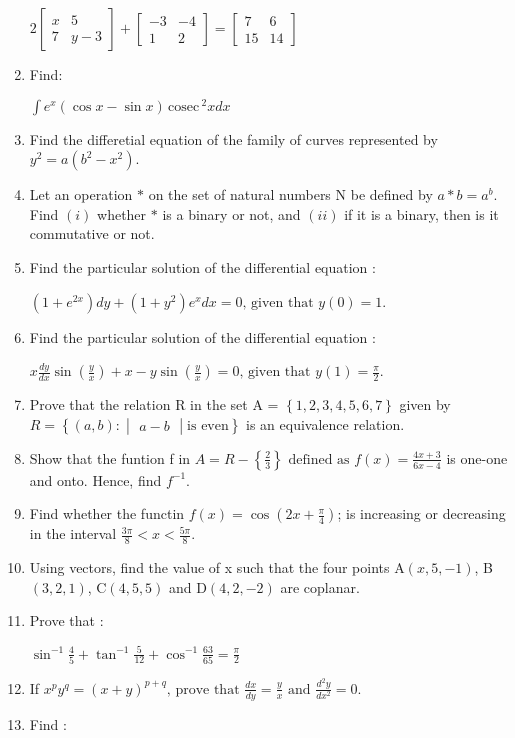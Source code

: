 \documentclass[12pt,-letter paper]{article}
\providecommand{\brak}[1]{\ensuremath{\left (#1\right)}}
\providecommand{\cbrak}[1]{\ensuremath{\left\{#1\right\}}}
\theoremstyle{remark}
\newcommand{\cosec}{\,\text{cosec}\,}
\newcommand{\mydet}[1]{\ensuremath{\begin{vmatrix}#1\end{vmatrix}}}
\begin{document}
\begin{enumerate}
	$2\begin{bmatrix}
		x & 5\\
		7 & y - 3
	\end{bmatrix}
		+ \begin{bmatrix}
		-3 & -4\\
		1 & 2
	\end{bmatrix}
	= \begin{bmatrix}
		7 & 6\\
		15 & 14
	\end{bmatrix}$
\item  Find:


	$\int e^x\brak{\cos x - \sin x}\cosec^2 x dx$
\item Find the differetial equation of the family of curves represented by $y^2 = a\brak{b^2 - x^2}$.
\item  Let an operation $\ast$ on the set of natural numbers N be defined by $a \ast b = a^b$. Find \brak{i} whether $\ast$ is a binary or not, and \brak{ii} if it is a binary, then is it commutative or not. 
\item  Find the particular solution of the differential equation :


	$\brak{1 + e^{2x}}dy + \brak{1 + y^{2}}e^xdx = 0\text{, given that } y\brak{0} = 1$.
\item Find the particular solution of the differential equation :


	$x\frac{dy}{dx}\sin\brak{\frac{y}{x}} + x - y\sin\brak{\frac{y}{x}} = 0\text{, given that } y\brak{1} = \frac{\pi}{2}$.
\item Prove that the relation R in the set A = \cbrak{1, 2, 3, 4, 5, 6, 7} given by $R = \cbrak{\brak{a, b} : \mydet{ a - b} \text{is even}}$ is an equivalence relation.
\item  Show that the funtion f in $A = R - \cbrak{\frac{2}{3}} \text{ defined as }f\brak{x}=\frac{4x + 3}{6x - 4}$ is one-one and onto. Hence, find $f^{-1}$.
\item  Find whether the functin $f\brak{x} = \cos\brak{2x + \frac{\pi}{4}}$; is increasing or decreasing in the interval $\frac{3\pi}{8} < x < \frac{5\pi}{8}$.
\item  Using vectors, find the value of x such that the four points A\brak{x, 5, -1}, B\brak{3, 2, 1}, C\brak{4, 5, 5} and D\brak{4, 2, -2} are coplanar.
\item  Prove that :


	$\sin^{-1}\frac{4}{5} + \tan^{-1}\frac{5}{12} + \cos^{-1}\frac{63}{65} = \frac{\pi}{2}$
\item  If $x^p{y}^{q} = {\brak{x + y}}^{p + q}\text{, prove that }\frac{dx}{dy} = \frac{y}{x} \text{ and } \frac{d^2y}{dx^2} = 0$.
\item  Find : 



\end{enumerate}
\end{document}
